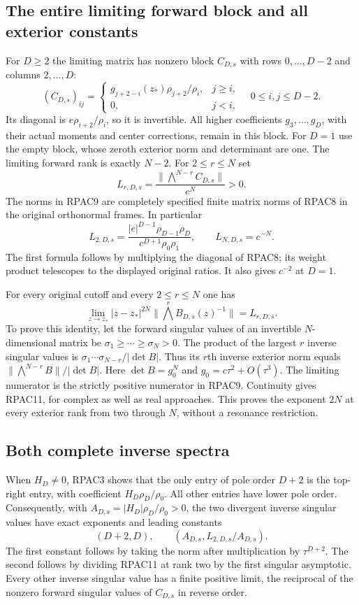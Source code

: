 \subsection{The entire limiting forward block and all exterior constants}
For $D\ge2$ the limiting matrix has nonzero block $C_{D,s}$
with rows $0,\ldots,D-2$ and columns $2,\ldots,D$:
\[
 (C_{D,s})_{ij}=
 \begin{cases}g_{j+2-i}(z_*)\rho_{j+2}/\rho_i,&j\ge i,\\
 0,&j<i,
 \end{cases}\quad 0\le i,j\le D-2 .\tag{RPAC8}
\]
Its diagonal is $e\rho_{i+2}/\rho_i$, so it is invertible.
All higher coefficients $g_3,\ldots,g_D$, with their actual
moments and center corrections, remain in this block.
For $D=1$ use the empty block, whose zeroth exterior norm and
determinant are one. The limiting forward rank is exactly $N-2$.
For $2\le r\le N$ set
\[
 L_{r,D,s}=\frac{\|\bigwedge^{N-r}C_{D,s}\|}{c^N}>0.
 \tag{RPAC9}
\]
The norms in RPAC9 are completely specified finite matrix norms
of RPAC8 in the original orthonormal frames. In particular
\[
 L_{2,D,s}=\frac{|e|^{D-1}\rho_{D-1}\rho_D}
                    {c^{D+1}\rho_0\rho_1},\qquad
 L_{N,D,s}=c^{-N}.\tag{RPAC10}
\]
The first formula follows by multiplying the diagonal of RPAC8;
its weight product telescopes to the displayed original ratios.
It also gives $c^{-2}$ at $D=1$.

For every original cutoff and every $2\le r\le N$ one has
\[
 \lim_{z\to z_*}|z-z_*|^{2N}
       \|\bigwedge^rB_{D,s}(z)^{-1}\|=L_{r,D,s}.
 \tag{RPAC11}
\]
To prove this identity, let the forward singular values of an
invertible $N$-dimensional matrix be
$\sigma_1\ge\cdots\ge\sigma_N>0$. The product of the largest
$r$ inverse singular values is
$\sigma_1\cdots\sigma_{N-r}/|\det B|$.
Thus its $r$th inverse exterior norm equals
$\|\bigwedge^{N-r}B\|/|\det B|$.
Here $\det B=g_0^N$ and $g_0=c\tau^2+O(\tau^3)$.
The limiting numerator is the strictly positive numerator in
RPAC9. Continuity gives RPAC11, for complex as well as real
approaches. This proves the exponent $2N$ at every exterior rank
from two through $N$, without a resonance restriction.

\subsection{Both complete inverse spectra}
When $H_D\ne0$, RPAC3 shows that the only entry of pole order
$D+2$ is the top-right entry, with coefficient
$H_D\rho_D/\rho_0$. All other entries have lower pole order.
Consequently, with
$A_{D,s}=|H_D|\rho_D/\rho_0>0$, the two divergent inverse
singular values have exact exponents and leading constants
\[
 (D+2,D),\qquad (A_{D,s},L_{2,D,s}/A_{D,s}).\tag{RPAC12}
\]
The first constant follows by taking the norm after multiplication
by $\tau^{D+2}$. The second follows by dividing RPAC11 at rank
two by the first singular asymptotic. Every other inverse singular
value has a finite positive limit, the reciprocal of the nonzero
forward singular values of $C_{D,s}$ in reverse order.


